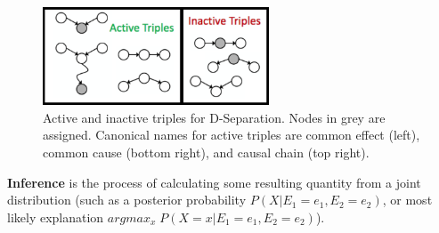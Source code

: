 \documentclass[11pt]{article}
\begin{document}
\begin{figure}[ht]
    \centering
    \includegraphics[width=0.6\textwidth]{figs/triples.png}
    \caption{Active and inactive triples for D-Separation. Nodes in grey are assigned. Canonical names for active triples are common effect (left), common cause (bottom right), and causal chain (top right).}
    \label{fig:triples}
\end{figure}

\newpage
\textbf{Inference} is the process of calculating some resulting quantity from a joint distribution (such as a posterior probability $P(X|E_1=e_1,E_2=e_2)$, or most likely explanation $argmax_x \; P(X=x|E_1=e_1,E_2=e_2)$).
\end{document}
